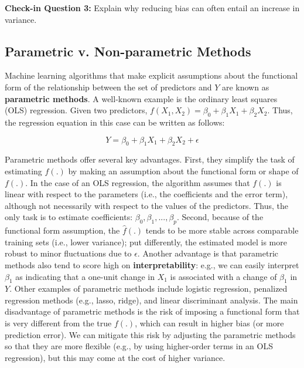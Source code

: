 \documentclass{book}
\begin{document}
\textbf{Check-in Question 3:} Explain why reducing bias can often entail an
increase in variance.

\hypertarget{parametric-v.-non-parametric-methods}{%
\subsection{Parametric v. Non-parametric
Methods}\label{parametric-v.-non-parametric-methods}}

Machine learning algorithms that make explicit assumptions about the
functional form of the relationship between the set of predictors and \(Y\)
are known as \textbf{parametric methods}. A well-known example is the ordinary
least squares (OLS) regression. Given two predictors,
\(f \left( X_{1}, X_{2} \right) = \beta _{0}+ \beta _{1}X_{1}+ \beta _{2}X_{2}\).
Thus, the regression equation in this case can be written as follows:

\[Y= \beta _{0}+ \beta _{1}X_{1}+  \beta _{2}X_{2}+ \epsilon\]

Parametric methods offer several key advantages. First, they simplify the task
of estimating \(f(.)\) by making an assumption about the functional form or
shape of \(f(.)\). In the case of an OLS regression, the algorithm assumes
that \(f(.)\) is linear with respect to the parameters (i.e., the coefficients
and the error term), although not necessarily with respect to the values of
the predictors. Thus, the only task is to estimate coefficients:
\(\beta _{0}, \beta _{1}, ..., \beta _{p}\). Second, because of the functional
form assumption, the \(\hat{f}(.)\) tends to be more stable across comparable
training sets (i.e., lower variance); put differently, the estimated model is
more robust to minor fluctuations due to \(\epsilon\). Another advantage is
that parametric methods also tend to score high on \textbf{interpretability}:
e.g., we can easily interpret \(\beta _{1}\) as indicating that a one-unit
change in \(X_{1}\) is associated with a change of \(\beta _{1}\) in \(Y\).
Other examples of parametric methods include logistic regression, penalized
regression methods (e.g., lasso, ridge), and linear discriminant analysis. The
main disadvantage of parametric methods is the risk of imposing a functional
form that is very different from the true \(f(.)\), which can result in higher
bias (or more prediction error). We can mitigate this risk by adjusting the
parametric methods so that they are more flexible (e.g., by using higher-order
terms in an OLS regression), but this may come at the cost of higher variance.
\end{document}
